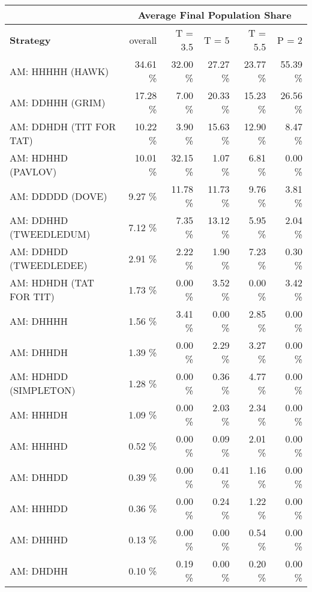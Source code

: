 \begin{tabular}{|l|r|r|r|r|r|}
\hline
 & \multicolumn{5}{c|}{{\bf Average Final Population Share}} \\
\hline
{\bf Strategy} & overall &  T = 3.5 & T = 5 & T = 5.5 & P = 2\\ \hline
AM: HHHHH (HAWK)             &   34.61 \%  &   32.00 \%  &   27.27 \%  &   23.77 \%  &   55.39 \% \\
AM: DDHHH (GRIM)             &   17.28 \%  &    7.00 \%  &   20.33 \%  &   15.23 \%  &   26.56 \% \\
AM: DDHDH (TIT FOR TAT)      &   10.22 \%  &    3.90 \%  &   15.63 \%  &   12.90 \%  &    8.47 \% \\
AM: HDHHD (PAVLOV)           &   10.01 \%  &   32.15 \%  &    1.07 \%  &    6.81 \%  &    0.00 \% \\
AM: DDDDD (DOVE)             &    9.27 \%  &   11.78 \%  &   11.73 \%  &    9.76 \%  &    3.81 \% \\
AM: DDHHD (TWEEDLEDUM)       &    7.12 \%  &    7.35 \%  &   13.12 \%  &    5.95 \%  &    2.04 \% \\
AM: DDHDD (TWEEDLEDEE)       &    2.91 \%  &    2.22 \%  &    1.90 \%  &    7.23 \%  &    0.30 \% \\
AM: HDHDH (TAT FOR TIT)      &    1.73 \%  &    0.00 \%  &    3.52 \%  &    0.00 \%  &    3.42 \% \\
AM: DHHHH                    &    1.56 \%  &    3.41 \%  &    0.00 \%  &    2.85 \%  &    0.00 \% \\
AM: DHHDH                    &    1.39 \%  &    0.00 \%  &    2.29 \%  &    3.27 \%  &    0.00 \% \\
AM: HDHDD (SIMPLETON)        &    1.28 \%  &    0.00 \%  &    0.36 \%  &    4.77 \%  &    0.00 \% \\
AM: HHHDH                    &    1.09 \%  &    0.00 \%  &    2.03 \%  &    2.34 \%  &    0.00 \% \\
AM: HHHHD                    &    0.52 \%  &    0.00 \%  &    0.09 \%  &    2.01 \%  &    0.00 \% \\
AM: DHHDD                    &    0.39 \%  &    0.00 \%  &    0.41 \%  &    1.16 \%  &    0.00 \% \\
AM: HHHDD                    &    0.36 \%  &    0.00 \%  &    0.24 \%  &    1.22 \%  &    0.00 \% \\
AM: DHHHD                    &    0.13 \%  &    0.00 \%  &    0.00 \%  &    0.54 \%  &    0.00 \% \\
AM: DHDHH                    &    0.10 \%  &    0.19 \%  &    0.00 \%  &    0.20 \%  &    0.00 \% \\

\end{tabular}
